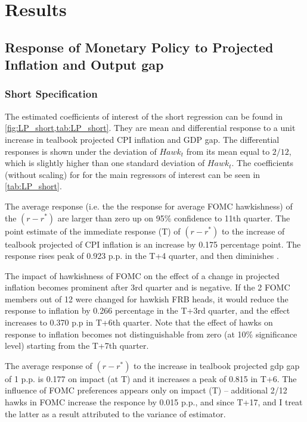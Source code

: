 \documentclass[11pt]{article}
\begin{document}
\section{Results}

\subsection{Response of Monetary Policy to Projected Inflation and Output gap}

\subsubsection{Short Specification}

The estimated coefficients of interest of the short regression can be found in \vref{fig:LP_short,tab:LP_short}. 
They are mean and differential response to a unit increase in tealbook projected CPI inflation and GDP gap. 
The differential responses is shown under the deviation of $\mathit{Hawk}_t$ from its mean equal to $2/12$, which is slightly higher than one standard deviation of $\mathit{Hawk}_t$. 
The coefficients (without scaling) for for the main regressors of interest can be seen in \vref{tab:LP_short}. 

The average response (i.e. the the response for average FOMC hawkishness) of the $\left(r-r^*\right)$ are larger than zero up on 95\% confidence to 11th quarter. The point estimate of the immediate response (T) of $\left(r-r^*\right)$ to the increase of tealbook projected of CPI inflation is an increase by 0.175 percentage point. The response rises peak of 0.923 p.p. in the T+4 quarter, and then diminishes .

The impact of hawkishness of FOMC on the effect of a change in projected inflation becomes prominent after 3rd quarter and is negative. If the 2 FOMC members out of 12 were changed for hawkish FRB heads, it would reduce the response to inflation by 0.266 percentage in the T+3rd quarter, and the effect increases to 0.370 p.p in T+6th quarter. 
Note that the effect of hawks on response to inflation becomes not distinguishable from zero (at 10\% significance level) starting from the T+7th quarter.

The average response of $\left(r-r^*\right)$ to the increase in tealbook projected gdp gap of 1 p.p. is 0.177 on impact (at T) and it increases a peak of 0.815 in T+6. The influence of FOMC preferences appears only on impact (T) -- additional 2/12 hawks in FOMC increase the responce by 0.015 p.p., and since T+17, and I treat the latter as a result attributed to the variance of estimator. 
\end{document}
